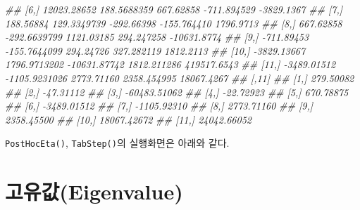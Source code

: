 \documentclass[
  10pt,
  krantz2,
  a4paper]{krantz}
\newenvironment{Shaded}{\begin{snugshade}}{\end{snugshade}}
\newcommand{\CommentTok}[1]{\textcolor[rgb]{0.56,0.35,0.01}{\textit{#1}}}
\newcommand{\DataTypeTok}[1]{\textcolor[rgb]{0.13,0.29,0.53}{#1}}
\newcommand{\KeywordTok}[1]{\textcolor[rgb]{0.13,0.29,0.53}{\textbf{#1}}}
\newcommand{\NormalTok}[1]{#1}
\newenvironment{Shaded}{\begin{snugshade}}{\end{snugshade}}
\theoremstyle{definition}
\theoremstyle{definition}
\theoremstyle{definition}
\theoremstyle{remark}
\begin{document}
\begin{Shaded}
\begin{Highlighting}[]
\CommentTok{\#\#  [6,] 12023.28652   188.5688359    667.62858  {-}711.894529  {-}3829.1367}
\CommentTok{\#\#  [7,]   188.56884   129.3349739   {-}292.66398  {-}155.764410   1796.9713}
\CommentTok{\#\#  [8,]   667.62858  {-}292.6639799   1121.03185   294.247258 {-}10631.8774}
\CommentTok{\#\#  [9,]  {-}711.89453  {-}155.7644099    294.24726   327.282119   1812.2113}
\CommentTok{\#\# [10,] {-}3829.13667  1796.9713202 {-}10631.87742  1812.211286 419517.6543}
\CommentTok{\#\# [11,] {-}3489.01512 {-}1105.9231026   2773.71160  2358.454995  18067.4267}
\CommentTok{\#\#              [,11]}
\CommentTok{\#\#  [1,]    279.50082}
\CommentTok{\#\#  [2,]    {-}47.31112}
\CommentTok{\#\#  [3,] {-}60483.51062}
\CommentTok{\#\#  [4,]    {-}22.72923}
\CommentTok{\#\#  [5,]    670.78875}
\CommentTok{\#\#  [6,]  {-}3489.01512}
\CommentTok{\#\#  [7,]  {-}1105.92310}
\CommentTok{\#\#  [8,]   2773.71160}
\CommentTok{\#\#  [9,]   2358.45500}
\CommentTok{\#\# [10,]  18067.42672}
\CommentTok{\#\# [11,]  24042.66052}
\end{Highlighting}
\end{Shaded}

\texttt{PostHocEta()}, \texttt{TabStep()}의 실행화면은 아래와 같다.

\begin{Shaded}
\end{Shaded}

\hypertarget{uxace0uxc720uxac12eigenvalue}{%
\section{\texorpdfstring{고유값(Eigenvalue)}{고유값(Eigenvalue)}}\label{uxace0uxc720uxac12eigenvalue}}
\end{document}
